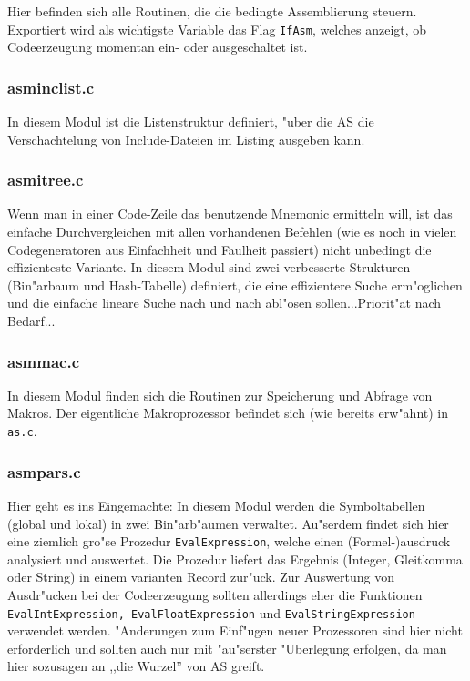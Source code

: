 \documentclass[12pt,a4paper,twoside]{report}
\newcommand{\tty}[1]{{\tt #1}}
\begin{document}
{Hier befinden sich alle Routinen, die die bedingte Assemblierung steuern.
Exportiert wird als wichtigste Variable das Flag \tty{IfAsm}, welches
anzeigt, ob Codeerzeugung momentan ein- oder ausgeschaltet ist.

\subsubsection{asminclist.c}

In diesem Modul ist die Listenstruktur definiert, "uber die AS die 
Verschachtelung von Include-Dateien im Listing ausgeben kann.

\subsubsection{asmitree.c}

Wenn man in einer Code-Zeile das benutzende Mnemonic ermitteln will, ist
das einfache Durchvergleichen mit allen vorhandenen Befehlen (wie es noch
in vielen Codegeneratoren aus Einfachheit und Faulheit passiert) nicht
unbedingt die effizienteste Variante.  In diesem Modul sind zwei
verbesserte Strukturen (Bin"arbaum und Hash-Tabelle) definiert, die eine
effizientere Suche erm"oglichen und die einfache lineare Suche nach und
nach abl"osen sollen...Priorit"at nach Bedarf...

\subsubsection{asmmac.c}

In diesem Modul finden sich die Routinen zur Speicherung und Abfrage von
Makros.  Der eigentliche Makroprozessor befindet sich (wie bereits
erw"ahnt) in {\tt as.c}.

\subsubsection{asmpars.c}

Hier geht es ins Eingemachte: In diesem Modul werden die Symboltabellen
(global und lokal) in zwei Bin"arb"aumen verwaltet.  Au"serdem findet sich
hier eine ziemlich gro"se Prozedur \tty{EvalExpression}, welche einen
(Formel-)ausdruck analysiert und auswertet.  Die Prozedur liefert das
Ergebnis (Integer, Gleitkomma oder String) in einem varianten Record zur"uck.
Zur Auswertung von Ausdr"ucken bei der Codeerzeugung sollten allerdings eher
die Funktionen \tty{EvalIntExpression, EvalFloatExpression} und 
\tty{EvalStringExpression} verwendet werden.  "Anderungen zum Einf"ugen neuer
Prozessoren sind hier nicht erforderlich und sollten auch nur mit "au"serster
"Uberlegung erfolgen, da man hier sozusagen an ,,die Wurzel'' von AS greift.

}
\end{document}
